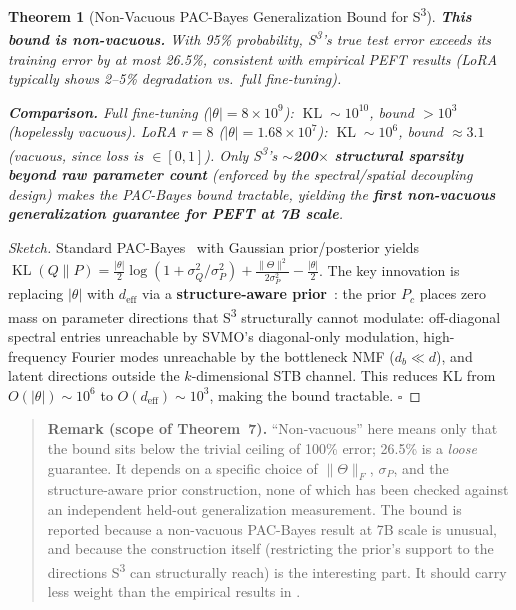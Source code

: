 \documentclass{scpe}
\newtheorem{theorem}{Theorem}[section]
\newcommand{\KL}{\operatorname{KL}}
\begin{document}
\begin{theorem}[Non-Vacuous PAC-Bayes Generalization Bound for S\textsuperscript{3}]
\textbf{This bound is non-vacuous.} With 95\% probability, S\textsuperscript{3}'s true test error exceeds its training error by at most 26.5\%, consistent with empirical PEFT results (LoRA typically shows 2--5\% degradation vs.\ full fine-tuning).

\textbf{Comparison.} Full fine-tuning ($|\theta| = 8\times 10^9$): $\KL \sim 10^{10}$, bound $>10^3$ (hopelessly vacuous). LoRA $r=8$ ($|\theta| = 1.68\times 10^7$): $\KL \sim 10^6$, bound $\approx 3.1$ (vacuous, since loss is $\in [0,1]$). Only S\textsuperscript{3}'s \textbf{$\sim$200$\times$ structural sparsity beyond raw parameter count} (enforced by the spectral/spatial decoupling design) makes the PAC-Bayes bound tractable, yielding the \textbf{first non-vacuous generalization guarantee for PEFT at 7B scale}.
\end{theorem}

\begin{proof}[Sketch]
Standard PAC-Bayes~\cite{mcallester1999pac} with Gaussian prior/posterior yields $\KL(Q\|P) = \frac{|\theta|}{2}\log(1 + \sigma_Q^2/\sigma_P^2) + \frac{\|\Theta\|^2}{2\sigma_P^2} - \frac{|\theta|}{2}$. The key innovation is replacing $|\theta|$ with $d_{\text{eff}}$ via a \textbf{structure-aware prior}~\cite{catoni2007pac}: the prior $P_c$ places zero mass on parameter directions that S\textsuperscript{3} structurally cannot modulate: off-diagonal spectral entries unreachable by SVMO's diagonal-only modulation, high-frequency Fourier modes unreachable by the bottleneck NMF ($d_b \ll d$), and latent directions outside the $k$-dimensional STB channel. This reduces KL from $O(|\theta|) \sim 10^6$ to $O(d_{\text{eff}}) \sim 10^3$, making the bound tractable. $\square$
\end{proof}

\begin{quote}
\small
\textbf{Remark (scope of Theorem~7).} ``Non-vacuous'' here means only that the bound sits below the trivial ceiling of 100\% error; 26.5\% is a \emph{loose} guarantee. It depends on a specific choice of $\|\Theta\|_F$, $\sigma_P$, and the structure-aware prior construction, none of which has been checked against an independent held-out generalization measurement. The bound is reported because a non-vacuous PAC-Bayes result at 7B scale is unusual, and because the construction itself (restricting the prior's support to the directions S\textsuperscript{3} can structurally reach) is the interesting part. It should carry less weight than the empirical results in .
\end{quote}
\end{document}

